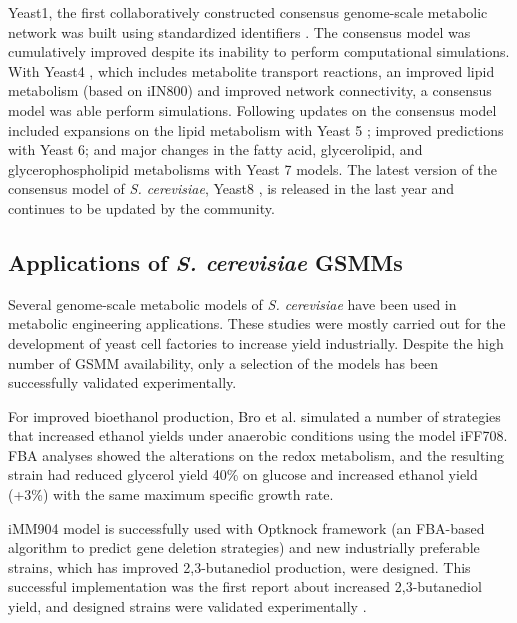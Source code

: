 \vspace{-1cm}

Yeast1, the first collaboratively constructed consensus genome-scale metabolic network was built using standardized identifiers \cite{herrgaard2008consensus}. The consensus model was cumulatively improved despite its inability to perform computational simulations. With Yeast4 \cite{dobson2010further}, which includes metabolite transport reactions, an improved lipid metabolism (based on iIN800) and improved network connectivity, a consensus model was able perform simulations. Following updates on the consensus model included expansions on the lipid metabolism with Yeast 5 \cite{heavner2012yeast}; improved predictions with Yeast 6\cite{heavner2013version}; and major changes in the fatty acid, glycerolipid, and glycerophospholipid metabolisms with Yeast 7 \cite{aung2013revising} models. The latest version of the consensus model of \emph{S. cerevisiae}, Yeast8 \cite{lu2019consensus}, is released in the last year and continues to be updated by the community.


\subsection{Applications of \emph{S. cerevisiae} GSMMs}
Several genome-scale metabolic models of \emph{S. cerevisiae} have been used in metabolic engineering applications. These studies were mostly carried out for the development of yeast cell factories to increase yield industrially. Despite the high number of GSMM availability, only a selection of the models has been successfully validated experimentally.

For improved bioethanol production, Bro et al. simulated a number of strategies that increased ethanol yields under anaerobic conditions using the model 	iFF708\cite{bro2006silico}. FBA analyses showed the alterations on the redox metabolism, and the resulting strain had reduced glycerol yield 40\% on glucose and increased ethanol yield (+3\%) with the same maximum specific growth rate.

iMM904 model is successfully used with Optknock framework \cite{burgard2003optknock} (an FBA-based algorithm to predict gene deletion strategies) and new industrially preferable strains, which has improved 2,3-butanediol production, were designed. This successful implementation was the first report about increased 2,3-butanediol yield, and designed strains were validated experimentally \cite{ng2012production}.

